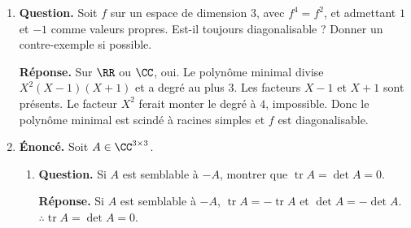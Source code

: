\documentclass[12pt, a4paper]{article}
\begin{document}
\begin{enumerate}[label=9.\arabic*., start=94]
\begin{minipage}[t]{\linewidth}
\begin{enumerate}[\arabic*.]
  \item \textbf{Question.} Montrer le même résultat si $u^p$ est diagonalisable pour un entier $p\geq2$.
\par\smallskip
\textbf{Réponse.} Même preuve avec $Q(X^p)$ : les racines sont simples car les $\lambda_i$ sont non nuls et le corps est $\CC$.

  \item \textbf{Question.} Montrer que l’inversibilité est nécessaire.
\par\smallskip
\textbf{Réponse.} $u=\begin{pmatrix}0&1\\0&0\end{pmatrix}$ n'est pas diagonalisable mais $u^2=0$ l'est.

  \item \textbf{Question.} Montrer que le résultat peut être faux sur $\RR$.
\par\smallskip
\textbf{Réponse.} Sur $\RR$, une rotation d'angle $\pi/2$ n'est pas diagonalisable, alors que son carré $-I_2$ l'est.

\end{enumerate}
\end{minipage}

  \item \begin{minipage}[t]{\linewidth}\raggedright
\textbf{Question.} Soit $f$ sur un espace de dimension $3$, avec $f^4=f^2$, et admettant $1$ et $-1$ comme valeurs propres. Est-il toujours diagonalisable ? Donner un contre-exemple si possible.
\par\smallskip
\textbf{Réponse.} Sur $\RR$ ou $\CC$, oui. Le polynôme minimal divise $X^2(X-1)(X+1)$ et a degré au plus $3$.
    Les facteurs $X-1$ et $X+1$ sont présents.
    Le facteur $X^2$ ferait monter le degré à $4$, impossible.
    Donc le polynôme minimal est scindé à racines simples et $f$ est diagonalisable.
\end{minipage}

  \item \begin{minipage}[t]{\linewidth}\raggedright
\textbf{Énoncé.} Soit $A\in\CC^{3\times3}$.

\begin{enumerate}[\arabic*.]
        \item \textbf{Question.} Si $A$ est semblable à $-A$, montrer que $\operatorname{tr}A=\det A=0$.
\par\smallskip
\textbf{Réponse.} Si $A$ est semblable à $-A$, $\operatorname{tr}A=-\operatorname{tr}A$ et $\det A=-\det A$.
        $\therefore\operatorname{tr}A=\det A=0$.


\end{enumerate}
\end{minipage}
\end{enumerate}
\end{document}
